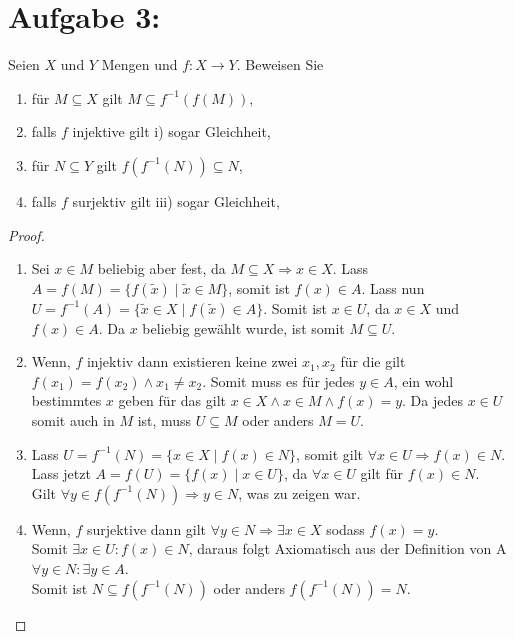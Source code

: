 \documentclass{exam}
\begin{document}
\section*{Aufgabe 3:}
Seien $X$ und $Y$ Mengen und $f : X \rightarrow Y$. Beweisen Sie
\begin{enumerate}[label=\roman*)]
    \item für $M \subseteq X$ gilt $M \subseteq f^{-1}(f(M))$,
    \item falls $f$ injektive gilt i) sogar Gleichheit,
    \item für $N \subseteq Y$ gilt $f(f^{-1}(N)) \subseteq N$,
    \item falls $f$ surjektiv gilt iii) sogar Gleichheit,
\end{enumerate}
\begin{proof}
    \leavevmode
    \begin{enumerate}[label=\roman*)]
        \item
              Sei $x \in M$ beliebig aber fest, da $M \subseteq X \Rightarrow x \in X$.
              Lass $A = f(M) = \{f(\tilde{x}) \mid \tilde{x} \in M\}$, somit ist $f(x) \in A$.
              Lass nun $U = f^{-1}(A) = \{\tilde{x} \in X \mid f(\tilde{x}) \in A\}$.
              Somit ist $x \in U$, da $x \in X$ und $f(x) \in A$.
              Da $x$ beliebig gewählt wurde, ist somit $M \subseteq U$. \checkmark
        \item
              Wenn, $f$ injektiv dann existieren keine zwei $x_1, x_2$ für die gilt $f(x_1) = f(x_2) \land x_1 \not= x_2$.
              Somit muss es für jedes $y \in A$, ein wohl bestimmtes $x$ geben für das gilt $x \in X \land x \in M \land f(x) = y$.
              Da jedes $x \in U$ somit auch in $M$ ist, muss $U \subseteq M$ oder anders $M = U$. \checkmark
        \item
              Lass $U = f^{-1}(N) = \{x \in X \mid f(x) \in N\}$, somit gilt $\forall x \in U \Rightarrow f(x) \in N$. \\
              Lass jetzt $A = f(U) = \{f(x) \mid x \in U\}$, da $\forall x \in U$ gilt für $f(x) \in N$. \\
              Gilt $\forall y \in f(f^{-1}(N)) \Rightarrow y \in N$, was zu zeigen war. \checkmark
        \item
              Wenn, $f$ surjektive dann gilt $\forall y \in N \Rightarrow \exists x \in X$ sodass $f(x) = y$. \\
              Somit $\exists x \in U: f(x) \in N$, daraus folgt Axiomatisch aus der Definition von A $\forall y \in N: \exists y \in A$.  \\
              Somit ist $N \subseteq f(f^{-1}(N))$ oder anders $f(f^{-1}(N)) = N$. \checkmark
    \end{enumerate}
\end{proof}
\end{document}
